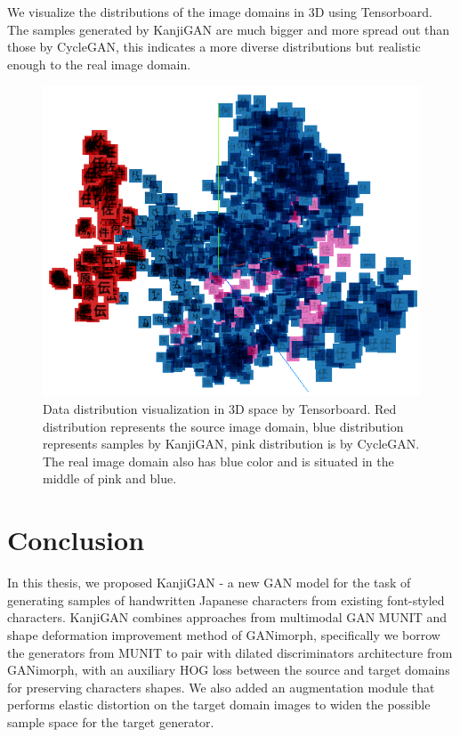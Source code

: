 \documentclass[12pt]{report}
\begin{document}
We visualize the distributions of the image domains in 3D using Tensorboard. The samples generated by KanjiGAN are much bigger and more spread out than those by CycleGAN, this indicates a more diverse distributions but realistic enough to the real image domain.

\begin{figure}[h]
	\centering
	\includegraphics[scale=1]{data-distribution-2}
	\caption{Data distribution visualization in 3D space by Tensorboard. Red distribution represents the source image domain, blue distribution represents samples by KanjiGAN, pink distribution is by CycleGAN. The real image domain also has blue color and is situated in the middle of pink and blue.}
	\label{fig:data-distribution-2}
\end{figure}

\chapter{Conclusion}
\label{chap:conclusion}

In this thesis, we proposed KanjiGAN - a new GAN model for the task of generating samples of handwritten Japanese characters from existing font-styled characters. KanjiGAN combines approaches from multimodal GAN MUNIT\cite{munit} and shape deformation improvement method of GANimorph\cite{ganimorph}, specifically we borrow the generators from MUNIT to pair with dilated discriminators architecture from GANimorph, with an auxiliary HOG loss between the source and target domains for preserving characters shapes. We also added an augmentation module that performs elastic distortion on the target domain images to widen the possible sample space for the target generator.
\end{document}
